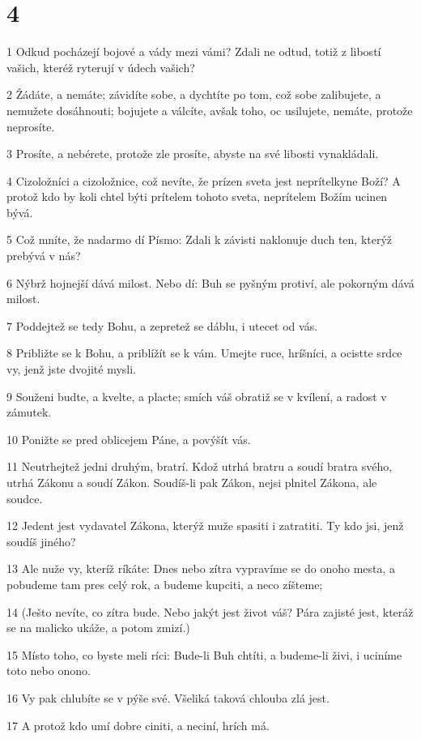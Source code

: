 \chapter{4}

\par 1 Odkud pocházejí bojové a vády mezi vámi? Zdali ne odtud, totiž z libostí vašich, kteréž ryterují v údech vašich?
\par 2 Žádáte, a nemáte; závidíte sobe, a dychtíte po tom, což sobe zalibujete, a nemužete dosáhnouti; bojujete a válcíte, avšak toho, oc usilujete, nemáte, protože neprosíte.
\par 3 Prosíte, a nebérete, protože zle prosíte, abyste na své libosti vynakládali.
\par 4 Cizoložníci a cizoložnice, což nevíte, že prízen sveta jest neprítelkyne Boží? A protož kdo by koli chtel býti prítelem tohoto sveta, neprítelem Božím ucinen bývá.
\par 5 Což mníte, že nadarmo dí Písmo: Zdali k závisti naklonuje duch ten, kterýž prebývá v nás?
\par 6 Nýbrž hojnejší dává milost. Nebo dí: Buh se pyšným protiví, ale pokorným dává milost.
\par 7 Poddejtež se tedy Bohu, a zepretež se dáblu, i utecet od vás.
\par 8 Približte se k Bohu, a priblížít se k vám. Umejte ruce, hríšníci, a ocistte srdce vy, jenž jste dvojité mysli.
\par 9 Souženi budte, a kvelte, a placte; smích váš obratiž se v kvílení, a radost v zámutek.
\par 10 Ponižte se pred oblicejem Páne, a povýšít vás.
\par 11 Neutrhejtež jedni druhým, bratrí. Kdož utrhá bratru a soudí bratra svého, utrhá Zákonu a soudí Zákon. Soudíš-li pak Zákon, nejsi plnitel Zákona, ale soudce.
\par 12 Jedent jest vydavatel Zákona, kterýž muže spasiti i zatratiti. Ty kdo jsi, jenž soudíš jiného?
\par 13 Ale nuže vy, kteríž ríkáte: Dnes nebo zítra vypravíme se do onoho mesta, a pobudeme tam pres celý rok, a budeme kupciti, a neco zíšteme;
\par 14 (Ješto nevíte, co zítra bude. Nebo jakýt jest život váš? Pára zajisté jest, kteráž se na malicko ukáže, a potom zmizí.)
\par 15 Místo toho, co byste meli ríci: Bude-li Buh chtíti, a budeme-li živi, i uciníme toto nebo onono.
\par 16 Vy pak chlubíte se v pýše své. Všeliká taková chlouba zlá jest.
\par 17 A protož kdo umí dobre ciniti, a neciní, hrích má.

